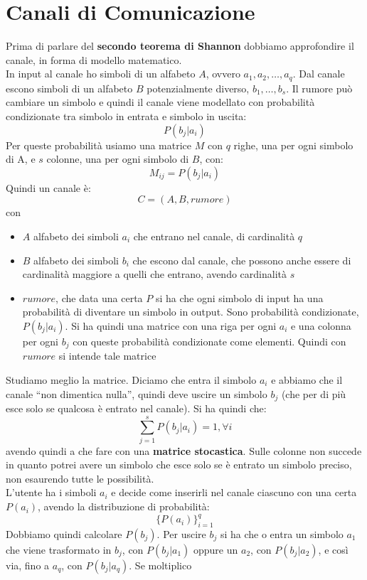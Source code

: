 \documentclass[a4paper,12pt, oneside]{book}
\begin{document}
\section{Canali di Comunicazione}
Prima di parlare del \textbf{secondo teorema di Shannon} dobbiamo approfondire
il canale, in forma di modello matematico. \\
In input al canale ho simboli di un alfabeto $A$, ovvero
$a_1,a_2,\ldots,a_q$. Dal canale escono simboli di un alfabeto $B$
potenzialmente diverso, $b_1,\ldots, b_s$. Il rumore può cambiare un simbolo e
quindi il canale viene modellato con probabilità condizionate tra simbolo in
entrata e simbolo in uscita:
\[P(b_j|a_i)\]
Per queste probabilità usiamo una matrice $M$ con $q$ righe, una per ogni
simbolo di A, e $s$ colonne, una per ogni simbolo di $B$, con:
\[M_{ij}=P(b_j|a_i)\]
Quindi un canale è:
\[C=(A,B,rumore)\]
con
\begin{itemize}
  \item $A$ alfabeto dei simboli $a_i$ che entrano nel canale, di cardinalità
  $q$ 
  \item $B$ alfabeto dei simboli $b_i$ che escono dal canale, che possono anche
  essere di cardinalità maggiore a quelli che entrano, avendo cardinalità $s$
  \item $rumore$, che data una certa $P$ si ha che ogni simbolo di input ha
  una probabilità di diventare un simbolo in output. Sono probabilità
  condizionate, $P(b_j|a_i)$. Si ha quindi una matrice con una riga per ogni
  $a_i$ e una colonna per ogni $b_j$ con queste probabilità condizionate come
  elementi. Quindi con $rumore$ si intende tale matrice
\end{itemize}
Studiamo meglio la matrice. Diciamo che entra il simbolo $a_i$ e abbiamo che il
canale ``non dimentica nulla'', quindi deve uscire un simbolo $b_j$ (che per di
più esce solo se qualcosa è entrato nel canale). Si ha quindi che:
\[\sum_{j=1}^s P(b_j|a_i)=1,\forall i\]
avendo quindi a che fare con una \textbf{matrice stocastica}. Sulle colonne non
succede in quanto potrei avere un simbolo che esce solo se è entrato un simbolo
preciso, non esaurendo tutte le possibilità.\\
L'utente ha i simboli $a_i$ e decide come inserirli nel canale ciascuno con una
certa $P(a_i)$, avendo la distribuzione di probabilità:
\[\{P(a_i)\}_{i=1}^q\]
Dobbiamo quindi calcolare $P(b_j)$. Per uscire $b_j$ si ha che o entra un
simbolo $a_1$ che viene trasformato in $b_j$, con $P(b_j|a_1)$ oppure un $a_2$,
con $P(b_j| a_2)$, e così via, fino a $a_q$, con $P(b_j| a_q)$. Se moltiplico
\end{document}
